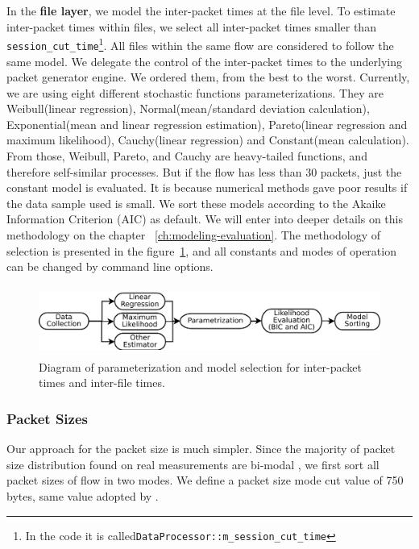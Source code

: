 In the \textbf{file layer}, we model the inter-packet times at the file level. To estimate inter-packet times within files, we select all inter-packet times smaller than \texttt{session\_cut\_time}\footnote{In the code it is called\texttt{DataProcessor::m\_session\_cut\_time} }. All files within the same flow are considered to follow the same model. We delegate the control of the inter-packet times to the underlying packet generator engine. We ordered them, from the best to the worst. Currently, we are using eight different stochastic functions parameterizations. They are Weibull(linear regression), Normal(mean/standard deviation calculation), Exponential(mean and linear regression estimation), Pareto(linear regression and maximum likelihood), Cauchy(linear regression) and Constant(mean calculation). From those, Weibull, Pareto, and Cauchy are heavy-tailed functions, and therefore self-similar processes. But if the flow has less than 30 packets, just the constant model is evaluated. It is because numerical methods gave poor results if the data sample used is small. We sort these models according to the Akaike Information Criterion (AIC) as default\cite{sourcesonoff-paper}\cite{bic-aic-comparision}. We will enter into deeper details on this methodology on the chapter ~\ref{ch:modeling-evaluation}. The methodology of selection is presented in the figure~\ref{fig:model-parameterization}, and all constants and modes of operation can be changed by command line options.


\begin{figure}[ht!]
    \centering
    \includegraphics[height=0.9in]{figures/ch3/simitar-parametrization}
    \caption{Diagram of parameterization and model selection for inter-packet times and inter-file times.}
    \label{fig:model-parameterization}
\end{figure}


\subsubsection{Packet Sizes}



Our approach for the packet size is much simpler. Since the majority of packet size distribution found on real measurements are bi-modal \cite{packet-distribution-model}\cite{sourcesonoff-paper}\cite{udp-flows-model}, we first sort all packet sizes of flow in two modes. We define a packet size mode cut value of 750 bytes, same value adopted by \cite{udp-flows-model}. 


